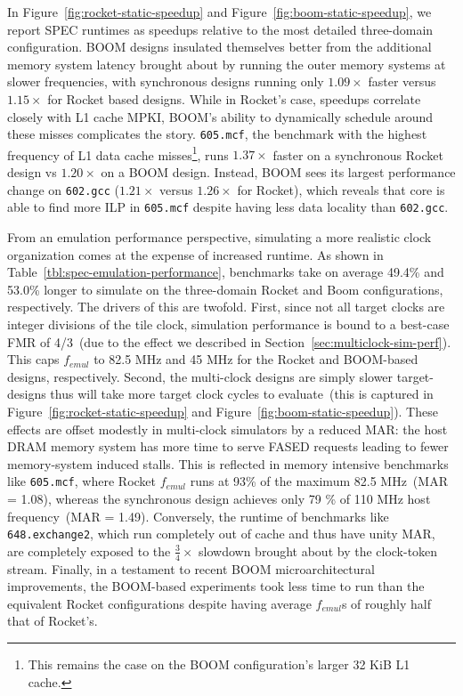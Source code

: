 In Figure~\ref{fig:rocket-static-speedup} and Figure~\ref{fig:boom-static-speedup}, we report
SPEC runtimes as speedups relative to the most detailed three-domain
configuration. BOOM designs insulated themselves better from the additional
memory system latency brought about by running the outer memory systems at
slower frequencies, with synchronous designs running only $1.09\times$ faster
versus $1.15\times$ for Rocket based designs. While in Rocket's case, speedups
correlate closely with L1 cache MPKI, BOOM's ability to dynamically schedule
around these misses complicates the story. \texttt{605.mcf}, the benchmark with
the highest frequency of L1 data cache misses\footnote{This remains the case on
the BOOM configuration's larger 32 KiB L1 cache.}, runs $1.37\times$ faster on a synchronous Rocket
design vs $1.20\times$ on a BOOM design. Instead, BOOM sees its largest
performance change on \texttt{602.gcc} ($1.21\times$ versus $1.26\times$ for
Rocket), which reveals that core is able to find more ILP in \texttt{605.mcf}
despite having less data locality than \texttt{602.gcc}.



From an emulation performance perspective, simulating a more realistic clock
organization comes at the expense of increased runtime. As shown in
Table~\ref{tbl:spec-emulation-performance}, benchmarks take on average 49.4\%
and 53.0\% longer to simulate on the three-domain Rocket and Boom
configurations, respectively. The drivers of this are twofold. First, since
not all target clocks are integer divisions of the tile clock, simulation
performance is bound to a best-case FMR of 4/3~(due to the effect we described in
Section~\ref{sec:multiclock-sim-perf}). This caps $f_{emul}$ to 82.5 MHz and
45 MHz for the Rocket and BOOM-based designs, respectively. Second, the
multi-clock designs are simply slower target-designs thus will take more target clock
cycles to evaluate~(this is captured in Figure~\ref{fig:rocket-static-speedup}
and Figure~\ref{fig:boom-static-speedup}). These effects are offset modestly in
multi-clock
simulators by a reduced MAR: the host DRAM memory system has more time to serve
FASED requests leading to fewer memory-system induced stalls. This is reflected in memory intensive benchmarks like
\texttt{605.mcf}, where Rocket $f_{emul}$ runs at 93\% of the maximum 82.5
MHz~(MAR = 1.08), whereas the synchronous design achieves only 79 \% of 110 MHz
host frequency~(MAR = 1.49). Conversely, the runtime of benchmarks like
\texttt{648.exchange2}, which run completely out of cache and thus have unity MAR, are
completely exposed to the $\frac{3}{4}\times$ slowdown brought about by the clock-token
stream. Finally, in a testament to recent BOOM microarchitectural improvements,
the BOOM-based experiments took less time to run than the equivalent Rocket
configurations despite having average $f_{emul}$s of roughly half that of
Rocket's.

